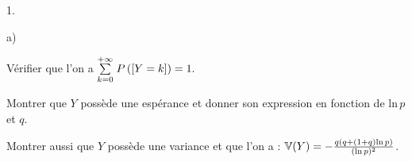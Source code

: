 \documentclass[11pt]{article}%
\begin{document}
\begin{noliste}{1.}
\begin{noliste}{a)}
\item Vérifier que l'on a ${\textstyle\sum\limits_{k = 0}^{+ \infty}}\hspace{.1cm}P\left(\left[ {Y =
k} \right]\right) = 1.$ 
\item Montrer que $Y$ possède une espérance et donner son expression en
fonction de $\mathrm{ln}\,p$ et $q$. 
\item Montrer aussi que $Y$ possède une variance et que l'on a : $\mathbb{V}(Y)
= -\frac{q(q + (1 +
q\mathrm{)ln}\,p)}{(\mathrm{ln}\,p)^{2}}$.\end{noliste}
\end{noliste}
\end{document}
